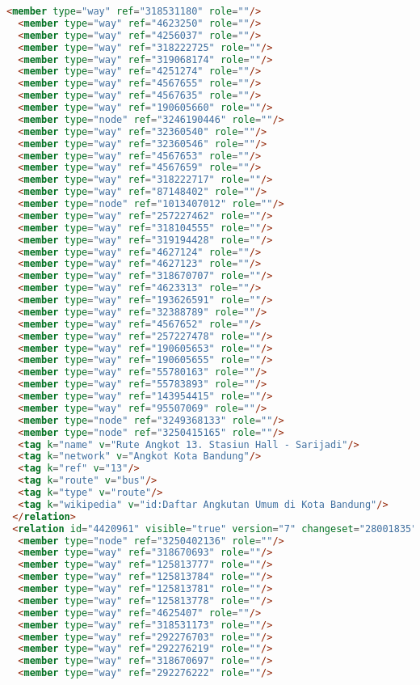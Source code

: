 \begin{lstlisting}[language=HTML,basicstyle=\tiny,caption=test.xml]
  <member type="way" ref="318531180" role=""/>
  <member type="way" ref="4623250" role=""/>
  <member type="way" ref="4256037" role=""/>
  <member type="way" ref="318222725" role=""/>
  <member type="way" ref="319068174" role=""/>
  <member type="way" ref="4251274" role=""/>
  <member type="way" ref="4567655" role=""/>
  <member type="way" ref="4567635" role=""/>
  <member type="way" ref="190605660" role=""/>
  <member type="node" ref="3246190446" role=""/>
  <member type="way" ref="32360540" role=""/>
  <member type="way" ref="32360546" role=""/>
  <member type="way" ref="4567653" role=""/>
  <member type="way" ref="4567659" role=""/>
  <member type="way" ref="318222717" role=""/>
  <member type="way" ref="87148402" role=""/>
  <member type="node" ref="1013407012" role=""/>
  <member type="way" ref="257227462" role=""/>
  <member type="way" ref="318104555" role=""/>
  <member type="way" ref="319194428" role=""/>
  <member type="way" ref="4627124" role=""/>
  <member type="way" ref="4627123" role=""/>
  <member type="way" ref="318670707" role=""/>
  <member type="way" ref="4623313" role=""/>
  <member type="way" ref="193626591" role=""/>
  <member type="way" ref="32388789" role=""/>
  <member type="way" ref="4567652" role=""/>
  <member type="way" ref="257227478" role=""/>
  <member type="way" ref="190605653" role=""/>
  <member type="way" ref="190605655" role=""/>
  <member type="way" ref="55780163" role=""/>
  <member type="way" ref="55783893" role=""/>
  <member type="way" ref="143954415" role=""/>
  <member type="way" ref="95507069" role=""/>
  <member type="node" ref="3249368133" role=""/>
  <member type="node" ref="3250415165" role=""/>
  <tag k="name" v="Rute Angkot 13. Stasiun Hall - Sarijadi"/>
  <tag k="network" v="Angkot Kota Bandung"/>
  <tag k="ref" v="13"/>
  <tag k="route" v="bus"/>
  <tag k="type" v="route"/>
  <tag k="wikipedia" v="id:Daftar Angkutan Umum di Kota Bandung"/>
 </relation>
 <relation id="4420961" visible="true" version="7" changeset="28001835" timestamp="2015-01-08T17:46:26Z" user="isonpurba" uid="2552445">
  <member type="node" ref="3250402136" role=""/>
  <member type="way" ref="318670693" role=""/>
  <member type="way" ref="125813777" role=""/>
  <member type="way" ref="125813784" role=""/>
  <member type="way" ref="125813781" role=""/>
  <member type="way" ref="125813778" role=""/>
  <member type="way" ref="4625407" role=""/>
  <member type="way" ref="318531173" role=""/>
  <member type="way" ref="292276703" role=""/>
  <member type="way" ref="292276219" role=""/>
  <member type="way" ref="318670697" role=""/>
  <member type="way" ref="292276222" role=""/>

\end{lstlisting}

